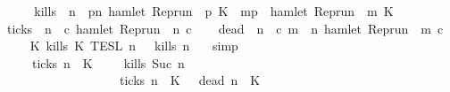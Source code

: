 \begin{isabellebody}
%
\isadelimproof
%
\endisadelimproof
%
\isatagproof
{}\isamarkupfalse%
\ {\isacharminus}\isanewline
\ \ \isamarkupfalse%
\ {\isacharquery}kills\ {\isacharequal}\ {\isacartoucheopen}{\isasymlambda}n\ {\isasymrho}{\isachardot}\ {\isasymforall}p{\isasymge}n{\isachardot}\ hamlet\ {\isacharparenleft}{\isacharparenleft}Rep{\isacharunderscore}run\ {\isasymrho}{\isacharparenright}\ p\ K\ {\isasymlongrightarrow}\ {\isacharparenleft}{\isasymforall}m{\isasymge}p{\isachardot}\ {\isasymnot}\ hamlet\ {\isacharparenleft}{\isacharparenleft}Rep{\isacharunderscore}run\ {\isasymrho}{\isacharparenright}\ m\ K\isanewline
\ \ \isamarkupfalse%
\ {\isacharquery}ticks\ {\isacharequal}\ {\isacartoucheopen}{\isasymlambda}n\ {\isasymrho}\ c{\isachardot}\ hamlet\ {\isacharparenleft}{\isacharparenleft}Rep{\isacharunderscore}run\ {\isasymrho}{\isacharparenright}\ n\ c{\isacharparenright}{\isacartoucheclose}\isanewline
\ \ \isamarkupfalse%
\ {\isacharquery}dead\ {\isacharequal}\ {\isacartoucheopen}{\isasymlambda}n\ {\isasymrho}\ c{\isachardot}\ {\isasymforall}m\ {\isasymge}\ n{\isachardot}\ {\isasymnot}hamlet\ {\isacharparenleft}{\isacharparenleft}Rep{\isacharunderscore}run\ {\isasymrho}{\isacharparenright}\ m\ c{\isacharparenright}{\isacartoucheclose}\isanewline
\ \ \isamarkupfalse%
\ {\isacartoucheopen}{\isasymlbrakk}\ K\ kills\ K\ {\isasymrbrakk}\isactrlsub T\isactrlsub E\isactrlsub S\isactrlsub L\isactrlbsup {\isasymge}\ n\isactrlesup \ {\isacharequal}\ {\isacharbraceleft}{\isasymrho}{\isachardot}\ {\isacharquery}kills\ n\ {\isasymrho}{\isacharbraceright}{\isacartoucheclose}\ \isamarkupfalse%
\ simp\isanewline
\ \ \isamarkupfalse%
\ \isamarkupfalse%
\ {\isacartoucheopen}{\isachardot}{\isachardot}{\isachardot}\ {\isacharequal}\ {\isacharparenleft}{\isacharbraceleft}{\isasymrho}{\isachardot}\ {\isasymnot}\ {\isacharquery}ticks\ n\ {\isasymrho}\ K\ \ {\isasyminter}\ {\isacharbraceleft}\ {\isasymrho}{\isachardot}\ {\isacharquery}kills\ {\isacharparenleft}Suc\ n{\isacharparenright}\ {\isasymrho}{\isacharbraceright}{\isacharparenright}\isanewline
\ \ \ \ \ \ \ \ \ \ \ \ \ \ \ \ \ {\isasymunion}\ {\isacharparenleft}{\isacharbraceleft}{\isasymrho}{\isachardot}\ {\isacharquery}ticks\ n\ {\isasymrho}\ K\ {\isasyminter}\ {\isacharbraceleft}{\isasymrho}{\isachardot}\ {\isacharquery}dead\ n\ {\isasymrho}\ K\isanewline

\end{isabellebody}
